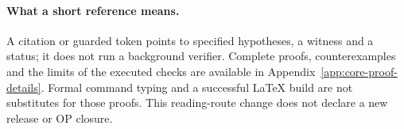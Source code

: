\paragraph{What a short reference means.}
A citation or guarded token points to specified hypotheses, a witness
and a status; it does not run a background verifier. Complete proofs,
counterexamples and the limits of the executed checks are available in
Appendix~\ref{app:core-proof-details}. Formal command typing and a
successful LaTeX build are not substitutes for those proofs. This
reading-route change does not declare a new release or OP closure.
